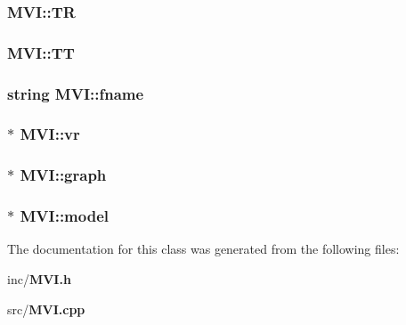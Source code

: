 \subsubsection{ {\bf MVI::TR}\hspace{0.3cm}{\tt  [private]}}\label{classMVI_ed3c60c55124dcc33cd2c7f8a9eb4b68}


\subsubsection{ {\bf MVI::TT}\hspace{0.3cm}{\tt  [private]}}\label{classMVI_3d425fad2d288ddcfc1123cec728ca45}


\subsubsection{\setlength{\rightskip}{0pt plus 5cm}string {\bf MVI::fname}\hspace{0.3cm}{\tt  [private]}}\label{classMVI_03b414b2878a3bd9f404b9eb6ca4d9c0}


\subsubsection{$\ast$ {\bf MVI::vr}\hspace{0.3cm}{\tt  [private]}}\label{classMVI_eb6c1bf8a6f2fc713574ff2e351bff58}


\subsubsection{$\ast$ {\bf MVI::graph}\hspace{0.3cm}{\tt  [private]}}\label{classMVI_2d1b3fefaa2dcc0dbdb059f739479fd7}


\subsubsection{$\ast$ {\bf MVI::model}\hspace{0.3cm}{\tt  [private]}}\label{classMVI_d7e7496b16b254e6044d4fd04efd2c9c}




The documentation for this class was generated from the following files:\begin{CompactItemize}
\item 
inc/{\bf MVI.h}\item 
src/{\bf MVI.cpp}\end{CompactItemize}
